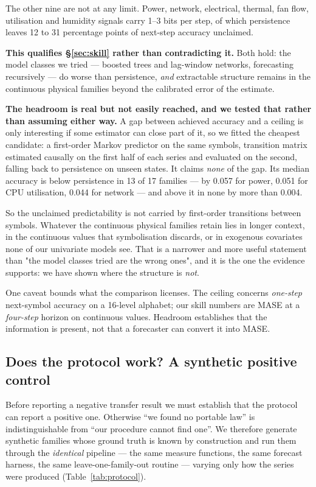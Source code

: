 \documentclass[11pt,a4paper]{article}
\newcommand{\num}[1]{#1}
\begin{document}
The other nine are not at any limit. Power, network, electrical, thermal, fan
flow, utilisation and humidity signals carry \num{1}--\num{3} bits per step, of
which persistence leaves \num{12} to \num{31} percentage points of next-step
accuracy unclaimed.

\textbf{This qualifies \S\ref{sec:skill} rather than contradicting it.} Both
hold: the model classes we tried --- boosted trees and lag-window networks,
forecasting recursively --- do worse than persistence, \emph{and} extractable
structure remains in the continuous physical families beyond the calibrated
error of the estimate.

\textbf{The headroom is real but not easily reached, and we tested that rather
than assuming either way.} A gap between achieved accuracy and a ceiling is only
interesting if some estimator can close part of it, so we fitted the cheapest
candidate: a first-order Markov predictor on the same symbols, transition matrix
estimated causally on the first half of each series and evaluated on the second,
falling back to persistence on unseen states. It claims \emph{none} of the gap.
Its median accuracy is below persistence in \num{13} of \num{17} families --- by
\num{0.057} for power, \num{0.051} for CPU utilisation, \num{0.044} for network
--- and above it in none by more than \num{0.004}.

So the unclaimed predictability is not carried by first-order transitions
between symbols. Whatever the continuous physical families retain lies in longer
context, in the continuous values that symbolisation discards, or in exogenous
covariates none of our univariate models see. That is a narrower and more useful
statement than "the model classes tried are the wrong ones", and it is the one
the evidence supports: we have shown where the structure is \emph{not}.

One caveat bounds what the comparison licenses. The ceiling concerns
\emph{one-step} next-symbol accuracy on a \num{16}-level alphabet; our skill
numbers are MASE at a \emph{four-step} horizon on continuous values. Headroom
establishes that the information is present, not that a forecaster can convert
it into MASE.

\subsection{Does the protocol work? A synthetic positive control}
\label{sec:protocol}

Before reporting a negative transfer result we must establish that the protocol
can report a positive one. Otherwise ``we found no portable law'' is
indistinguishable from ``our procedure cannot find one''. We therefore generate
synthetic families whose ground truth is known by construction and run them
through the \emph{identical} pipeline --- the same measure functions, the same
forecast harness, the same leave-one-family-out routine --- varying only how the
series were produced (Table~\ref{tab:protocol}).
\end{document}
